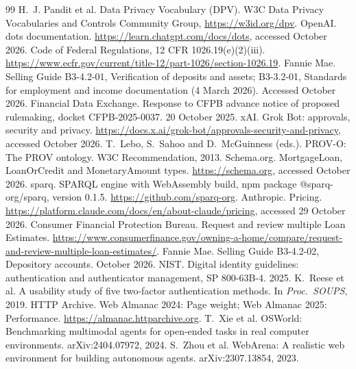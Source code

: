 \documentclass[11pt]{article}
\begin{document}
\begin{thebibliography}{99}
 H.~J. Pandit et al. Data Privacy Vocabulary (DPV). W3C Data Privacy Vocabularies and Controls Community Group, \url{https://w3id.org/dpv}.
 OpenAI. dots documentation. \url{https://learn.chatgpt.com/docs/dots}, accessed October 2026.
 Code of Federal Regulations, 12 CFR 1026.19(e)(2)(iii). \url{https://www.ecfr.gov/current/title-12/part-1026/section-1026.19}.
 Fannie Mae. Selling Guide B3-4.2-01, Verification of deposits and assets; B3-3.2-01, Standards for employment and income documentation (4 March 2026). Accessed October 2026.
 Financial Data Exchange. Response to CFPB advance notice of proposed rulemaking, docket CFPB-2025-0037. 20 October 2025.
 xAI. Grok Bot: approvals, security and privacy. \url{https://docs.x.ai/grok-bot/approvals-security-and-privacy}, accessed October 2026.
 T.~Lebo, S.~Sahoo and D.~McGuinness (eds.). PROV-O: The PROV ontology. W3C Recommendation, 2013.
 Schema.org. MortgageLoan, LoanOrCredit and MonetaryAmount types. \url{https://schema.org}, accessed October 2026.
 sparq. SPARQL engine with WebAssembly build, npm package @sparq-org/sparq, version 0.1.5. \url{https://github.com/sparq-org}.
 Anthropic. Pricing. \url{https://platform.claude.com/docs/en/about-claude/pricing}, accessed 29 October 2026.
 Consumer Financial Protection Bureau. Request and review multiple Loan Estimates. \url{https://www.consumerfinance.gov/owning-a-home/compare/request-and-review-multiple-loan-estimates/}.
 Fannie Mae. Selling Guide B3-4.2-02, Depository accounts. October 2026.
 NIST. Digital identity guidelines: authentication and authenticator management, SP 800-63B-4. 2025.
 K.~Reese et al. A usability study of five two-factor authentication methods. In \emph{Proc.\ SOUPS}, 2019.
 HTTP Archive. Web Almanac 2024: Page weight; Web Almanac 2025: Performance. \url{https://almanac.httparchive.org}.
 T.~Xie et al. OSWorld: Benchmarking multimodal agents for open-ended tasks in real computer environments. arXiv:2404.07972, 2024.
 S.~Zhou et al. WebArena: A realistic web environment for building autonomous agents. arXiv:2307.13854, 2023.
\end{thebibliography}
\end{document}
